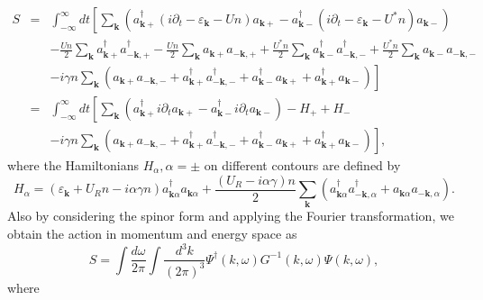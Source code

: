 \documentclass[aps,onecolumn,superscriptaddress,notitlepage,longbibliography]{revtex4-1}
\begin{document}
\begin{eqnarray}
  S & = & \int_{- \infty}^{\infty} d t \left[ \sum_{\mathbf{k}}
  (a^{\dagger}_{\mathbf{k}+} (i \partial_t - \varepsilon_{\mathbf{k}} - U
  n) a_{\mathbf{k}+} - a^{\dagger}_{\mathbf{k}-} (i \partial_t -
  \varepsilon_{\mathbf{k}} - U^{\ast} n) a_{\mathbf{k}-}) \right.
  \nonumber\\
  &  & - \frac{U n}{2} \sum_{\mathbf{k}} a_{\mathbf{k}+}^{\dagger}
  a_{-\mathbf{k}, +}^{\dagger} - \frac{U n}{2} \sum_{\mathbf{k}}
  a_{\mathbf{k}+} a_{-\mathbf{k}, +} + \frac{U^{\ast} n}{2}
  \sum_{\mathbf{k}} a_{\mathbf{k}-}^{\dagger} a_{-\mathbf{k},
  -}^{\dagger} + \frac{U^{\ast} n}{2} \sum_{\mathbf{k}} a_{\mathbf{k}-}
  a_{-\mathbf{k}, -} \nonumber\\
  &  & - i \gamma n \left. \sum_{\mathbf{k}} (a_{\mathbf{k}+}
  a_{-\mathbf{k}, -} + a_{\mathbf{k}+}^{\dagger} a_{-\mathbf{k},
  -}^{\dagger} + a_{\mathbf{k}-}^{\dagger} a_{\mathbf{k}+} +
  a_{\mathbf{k}+}^{\dagger} a_{\mathbf{k}-}) \right] \\
  & = & \int_{- \infty}^{\infty} d t \left[ \sum_{\mathbf{k}}
  (a^{\dagger}_{\mathbf{k}+} i \partial_t a_{\mathbf{k}+} -
  a^{\dagger}_{\mathbf{k}-} i \partial_t a_{\mathbf{k}-}) - H_+ + H_-
  \right. \nonumber\\
  &  & - i \gamma n \left. \sum_{\mathbf{k}} (a_{\mathbf{k}+}
  a_{-\mathbf{k}, -} + a_{\mathbf{k}+}^{\dagger} a_{-\mathbf{k},
  -}^{\dagger} + a_{\mathbf{k}-}^{\dagger} a_{\mathbf{k}+} +
  a_{\mathbf{k}+}^{\dagger} a_{\mathbf{k}-}) \right], 
\end{eqnarray}
where the Hamiltonians $H_{\alpha}, \alpha = \pm$ on different contours are
defined by
\begin{equation}
  H_{\alpha} = (\varepsilon_{\mathbf{k}} + U_R n - i \alpha \gamma n)
  a^{\dagger}_{\mathbf{k} \alpha} a_{\mathbf{k} \alpha} + \frac{(U_R - i
  \alpha \gamma) n}{2} \sum_{\mathbf{k}} (a_{\mathbf{k} \alpha}^{\dagger}
  a_{-\mathbf{k}, \alpha}^{\dagger} + a_{\mathbf{k} \alpha}
  a_{-\mathbf{k}, \alpha}) .
\end{equation}
Also by considering the spinor form and applying the Fourier transformation,
we obtain the action in momentum and energy space as
\begin{equation}
  S = \int \frac{d \omega}{2 \pi} \int \frac{d^3 k}{(2 \pi)^3} \Psi^{\dagger}
  (k, \omega) G^{- 1} (k, \omega) \Psi (k, \omega),
\end{equation}
where
\end{document}
